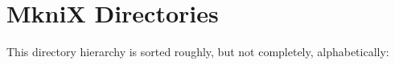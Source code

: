 \section{MkniX Directories}
This directory hierarchy is sorted roughly, but not completely, alphabetically:\begin{CompactList}
\item {}
\end{CompactList}
